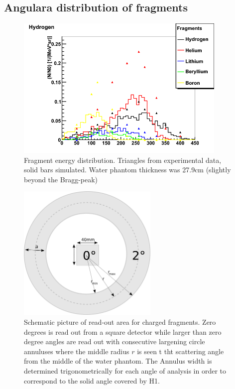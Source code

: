 \subsection{Angulara distribution of fragments\label{AngularDistributionText}}
\begin{figure}[h] 
\begin{center}
\includegraphics[width=0.9\textwidth]{images/fragmentEnergyDistr.png}  
\caption{\label{fig:fragmentEnergyDistr} Fragment energy distribution. Triangles from experimental data, solid bars simulated. Water phantom thickness was 27.9cm (slightly beyond the Bragg-peak)}
\end{center}
\end{figure}
\begin{figure}[!h] 
\begin{center}
\includegraphics[width=0.6\textwidth]{images/annulus.png}  
\caption{\label{fig:annulusesExplained} Schematic picture of read-out area for charged fragments. Zero degrees is read out from a square detector while larger than zero degree angles are read out with consecutive largening circle annuluses where the middle radius $r$ is seen t tht scattering angle from the middle of the water phantom. The Annulus width is determined trigonometrically for each angle of analysis in order to correspond to the solid angle covered by H1.}
\end{center}
\end{figure}

